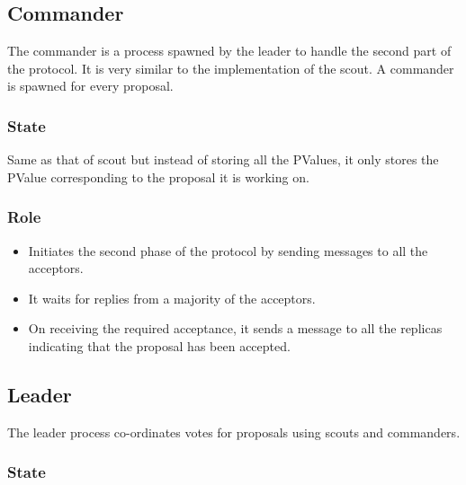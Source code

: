 \subsection{Commander}

The commander is a process spawned by the leader to handle the second part of
the protocol. It is very similar to the implementation of the scout. A commander
is spawned for every proposal.

\subsubsection{State}

Same as that of scout  but instead of storing all the
PValues, it only stores the PValue corresponding to the proposal it is working
on.

\subsubsection{Role}

\begin{itemize}
  \item Initiates the second phase of the protocol by sending 
    messages to all the acceptors.
  \item It waits for replies from a majority of the acceptors.
  \item On receiving the required acceptance, it sends a message to all the
    replicas indicating that the proposal has been accepted.
\end{itemize}

\subsection{Leader}

The leader process co-ordinates votes for proposals using scouts and commanders.

\subsubsection{State}

